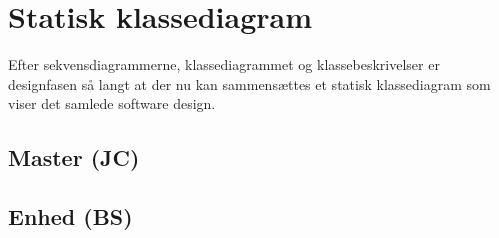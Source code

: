 \section{Statisk klassediagram}
Efter sekvensdiagrammerne, klassediagrammet og klassebeskrivelser er designfasen så langt at der nu kan sammensættes et statisk klassediagram som viser det samlede software design. 

\subsection{Master (JC)}


\clearpage

\subsection{Enhed (BS)}



\clearpage

